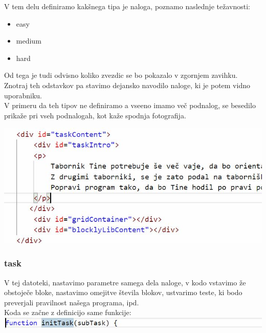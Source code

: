 \documentclass[11pt]{article} %
\begin{document}
V tem delu definiramo kakšnega tipa je naloga, poznamo naslednje težavnosti:

\begin{itemize}
\item easy
\item medium
\item hard
\end{itemize}

Od tega je tudi odvisno koliko zvezdic se bo pokazalo v zgornjem zavihku.\\
Znotraj teh odstavkov pa stavimo dejansko navodilo naloge, ki je potem vidno uporabniku. \\
V primeru da teh tipov ne definiramo a vseeno imamo več podnalog, se besedilo prikaže pri vseh podnalogah, kot kaže spodnja fotografija.

\includegraphics[scale=0.6]{index_ni_stopenj}
\subsubsection{task}

V tej datoteki, nastavimo parametre samega dela naloge, v kodo vstavimo že obstoječe bloke, nastavimo omejitve števila blokov, ustvarimo teste, ki bodo preverjali pravilnost našega programa, ipd. \\

Koda se začne z definicijo same funkcije: \\
\includegraphics[scale=0.6]{task_splosno_funkcija}\\
\end{document}
